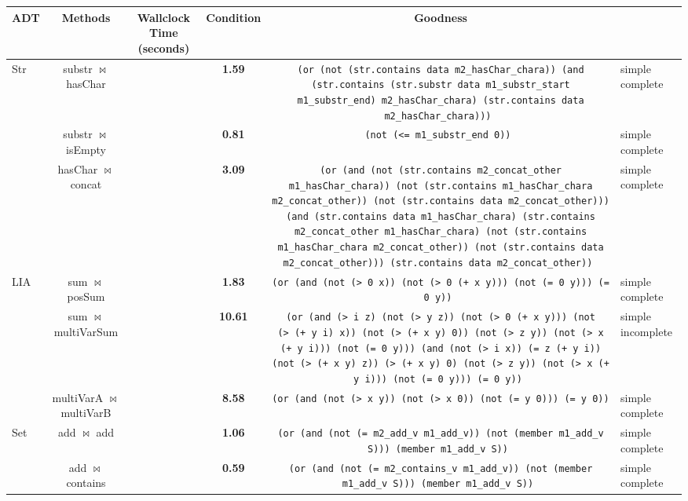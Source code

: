 \begin{table} \begin{center} \begin{tabular}{l|c|c|c|c} \toprule
\bf{ADT} & \bf{Methods} & Wallclock Time (seconds) & Condition & Goodness\\
\toprule
\hline
Str & substr $ \bowtie $ hasChar &  & \bf{1.59}& \texttt{(or (not (str.contains data m2\_hasChar\_chara)) (and (str.contains (str.substr data m1\_substr\_start m1\_substr\_end) m2\_hasChar\_chara) (str.contains data m2\_hasChar\_chara)))
} & simple complete\\
 & substr $ \bowtie $ isEmpty &  & \bf{0.81}& \texttt{(not (<= m1\_substr\_end 0))
} & simple complete\\
 & hasChar $ \bowtie $ concat &  & \bf{3.09}& \texttt{(or (and (not (str.contains m2\_concat\_other m1\_hasChar\_chara)) (not (str.contains m1\_hasChar\_chara m2\_concat\_other)) (not (str.contains data m2\_concat\_other))) (and (str.contains data m1\_hasChar\_chara) (str.contains m2\_concat\_other m1\_hasChar\_chara) (not (str.contains m1\_hasChar\_chara m2\_concat\_other)) (not (str.contains data m2\_concat\_other))) (str.contains data m2\_concat\_other))
} & simple complete\\
\hline
LIA & sum $ \bowtie $ posSum &  & \bf{1.83}& \texttt{(or (and (not (\textgreater\ 0 x)) (not (\textgreater\ 0 (+ x y))) (not (= 0 y))) (= 0 y))
} & simple complete\\
 & sum $ \bowtie $ multiVarSum &  & \bf{10.61}& \texttt{(or (and (\textgreater\ i z) (not (\textgreater\ y z)) (not (\textgreater\ 0 (+ x y))) (not (\textgreater\ (+ y i) x)) (not (\textgreater\ (+ x y) 0)) (not (\textgreater\ z y)) (not (\textgreater\ x (+ y i))) (not (= 0 y))) (and (not (\textgreater\ i x)) (= z (+ y i)) (not (\textgreater\ (+ x y) z)) (\textgreater\ (+ x y) 0) (not (\textgreater\ z y)) (not (\textgreater\ x (+ y i))) (not (= 0 y))) (= 0 y))
} & simple incomplete\\
 & multiVarA $ \bowtie $ multiVarB &  & \bf{8.58}& \texttt{(or (and (not (\textgreater\ x y)) (not (\textgreater\ x 0)) (not (= y 0))) (= y 0))
} & simple complete\\
\hline
Set & add $ \bowtie $ add &  & \bf{1.06}& \texttt{(or (and (not (= m2\_add\_v m1\_add\_v)) (not (member m1\_add\_v S))) (member m1\_add\_v S))
} & simple complete\\
 & add $ \bowtie $ contains &  & \bf{0.59}& \texttt{(or (and (not (= m2\_contains\_v m1\_add\_v)) (not (member m1\_add\_v S))) (member m1\_add\_v S))
} & simple complete\\

\end{tabular}
\end{center}
\end{table}
